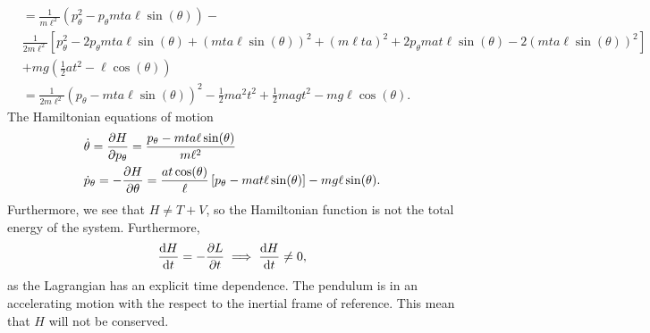 \documentclass{article}
\begin{document}
        \begin{align*}
            & = \frac{1}{m \ell^2} \left(p_\theta^2 - p_\theta m t a \ell \sin(\theta)\right) - \\
            & \frac{1}{2 m \ell^2} \left[ p_\theta^2 - 2 p_\theta mta\ell \sin(\theta) + (mta\ell \sin(\theta))^2 + (m\ell ta)^2 + 2 p_\theta m a t \ell \sin(\theta) - 2 (m t a \ell \sin(\theta))^2 \right] \\
            & +  mg \left(\frac{1}{2}a t^2 - \ell \cos(\theta)\right) \\
            & = \frac{1}{2 m \ell^2} \left(p_\theta - m t a \ell \sin(\theta)\right)^2 - \frac{1}{2} m a^2 t^2 + \frac{1}{2}m a g t^2 - mg \ell \cos(\theta).
        \end{align*}
        The Hamiltonian equations of motion
        \begin{align*}
            & \dot \theta = \pdv{H}{p_\theta} = \frac{p_\theta - m t a \ell\sin(\theta)}{m \ell^2} \\
            & \dot p_\theta = - \pdv{H}{\theta} = \frac{a t \cos(\theta)}{\ell} \left[ p_\theta - m a t \ell \sin(\theta) \right] - m g \ell \sin(\theta).
        \end{align*}
        Furthermore, we see that $H \neq T + V$, so the Hamiltonian function is not the total energy of the system. Furthermore, 
        \begin{equation*}
            \dv{H}{t} = - \pdv{L}{t} \implies \dv{H}{t} \neq 0,
        \end{equation*}
        as the Lagrangian has an explicit time dependence. The pendulum is in an accelerating motion with the respect to the inertial frame of reference. This mean that $H$ will not be conserved.
\end{document}
